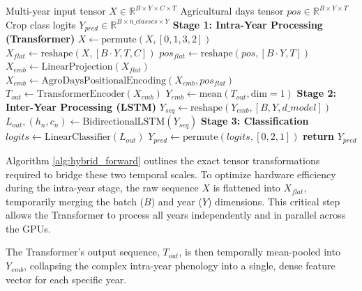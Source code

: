 \begin{algorithm}[htpb]
    \caption{Hierarchical Transformer-LSTM Forward Pass}
    \label{alg:hybrid_forward}
    \begin{algorithmic}[1]
        \Require Multi-year input tensor $X \in \mathbb{R}^{B \times Y \times C \times T}$
        \Require Agricultural days tensor $pos \in \mathbb{R}^{B \times Y \times T}$
        \Ensure Crop class logits $Y_{pred} \in \mathbb{R}^{B \times n\_classes \times Y}$
        \vspace{1.5mm}
        \State \textbf{Stage 1: Intra-Year Processing (Transformer)}
        \State $X \gets \text{permute}(X, [0, 1, 3, 2])$ 
        \State $X_{flat} \gets \text{reshape}(X, [B \cdot Y, T, C])$ 
        \State $pos_{flat} \gets \text{reshape}(pos, [B \cdot Y, T])$
        \State $X_{emb} \gets \text{LinearProjection}(X_{flat})$
        \State $X_{emb} \gets \text{AgroDaysPositionalEncoding}(X_{emb}, pos_{flat})$
        \State $T_{out} \gets \text{TransformerEncoder}(X_{emb})$ 
        \State $Y_{emb} \gets \text{mean}(T_{out}, \text{dim}=1)$ 
        \vspace{1.5mm}
        \State \textbf{Stage 2: Inter-Year Processing (LSTM)}
        \State $Y_{seq} \gets \text{reshape}(Y_{emb}, [B, Y, d\_model])$ 
        \State $L_{out}, (h_n, c_n) \gets \text{BidirectionalLSTM}(Y_{seq})$ 
        \vspace{1.5mm}
        \State \textbf{Stage 3: Classification}
        \State $logits \gets \text{LinearClassifier}(L_{out})$ 
        \State $Y_{pred} \gets \text{permute}(logits, [0, 2, 1])$ 
        \State \textbf{return} $Y_{pred}$
    \end{algorithmic}
\end{algorithm}

Algorithm \ref{alg:hybrid_forward} outlines the exact tensor transformations required to bridge these two temporal scales. 
To optimize hardware efficiency during the intra-year stage, the raw sequence $X$ is flattened into $X_{flat}$, temporarily merging the batch ($B$) and year ($Y$) dimensions. 
This critical step allows the Transformer to process all years independently and in parallel across the GPUs. 

The Transformer's output sequence, $T_{out}$, is then temporally mean-pooled into $Y_{emb}$,
collapsing the complex intra-year phenology into a single, dense feature vector for each specific year.


